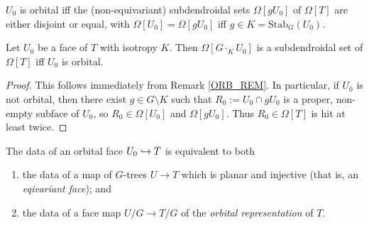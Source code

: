 \documentclass[a4paper,10pt,draft]{article}%
\begin{document}
\begin{remark}
      \label{ORB_REM}
      $U_0$ is orbital iff the (non-equivariant) subdendroidal sets $\Omega[g U_0]$ of $\Omega[T]$ are either
      disjoint or equal, with $\Omega[U_0] = \Omega[g U_0]$ iff $g \in K = \mathrm{Stab}_G(U_0)$.
\end{remark}


\begin{lemma}
      \label{ORB_INJ_LEM}
      Let $U_0$ be a face of $T$ with isotropy $K$.
      Then $\Omega[G \cdot_K U_0]$ is a subdendroidal set of $\Omega[T]$
      iff
      $U_0$ is orbital.
\end{lemma}

\begin{proof}
      This follows immediately from Remark \ref{ORB_REM}.
      In particular, 
      if $U_0$ is not orbital, then there exist $g \in G \setminus K$ such that
      $R_0 := U_0 \cap g U_0$ is a proper, non-empty subface of $U_0$, so $R_0 \in \Omega[U_0]$ and $\Omega[g U_0]$.
      Thus $R_0 \in \Omega[T]$ is hit at least twice.
\end{proof}

\begin{remark}
      \label{ORB_FACE_REM}
      The data of an orbital face $U_0 \hookrightarrow T$ is equivalent to both
      \begin{enumerate}
      \item the data of a map of $G$-trees $U \to T$ which is planar and injective
            (that is, an \textit{eqivariant face}); and
      \item the data of a face map $U/G \to T/G$ of the \textit{orbital representation} of $T$.
      \end{enumerate}
\end{remark}
\end{document}
